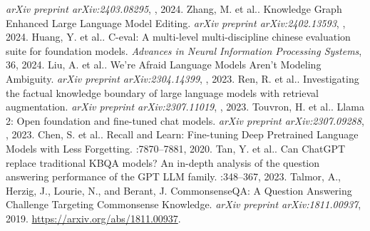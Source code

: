 \begin{thebibliography}{10}
\begin{small}
\newblock \emph{arXiv preprint arXiv:2403.08295}, , 2024.
 Zhang, M. et al.. 
\newblock Knowledge Graph Enhanced Large Language Model Editing. 
\newblock \emph{arXiv preprint arXiv:2402.13593}, , 2024.
 Huang, Y. et al.. 
\newblock C-eval: A multi-level multi-discipline chinese evaluation suite for foundation models. 
\newblock \emph{Advances in Neural Information Processing Systems}, 36, 2024.
 Liu, A. et al.. 
\newblock We're Afraid Language Models Aren't Modeling Ambiguity. 
\newblock \emph{arXiv preprint arXiv:2304.14399}, , 2023.
 Ren, R. et al.. 
\newblock Investigating the factual knowledge boundary of large language models with retrieval augmentation. 
\newblock \emph{arXiv preprint arXiv:2307.11019}, , 2023.
 Touvron, H. et al.. 
\newblock Llama 2: Open foundation and fine-tuned chat models. 
\newblock \emph{arXiv preprint arXiv:2307.09288}, , 2023.
 Chen, S. et al.. 
\newblock Recall and Learn: Fine-tuning Deep Pretrained Language Models with Less Forgetting. 
:7870--7881, 2020.
 Tan, Y. et al.. 
\newblock Can ChatGPT replace traditional KBQA models? An in-depth analysis of the question answering performance of the GPT LLM family. 
:348--367, 2023.
 Talmor, A., Herzig, J., Lourie, N., and Berant, J.
\newblock CommonsenseQA: A Question Answering Challenge Targeting Commonsense Knowledge.
\newblock \emph{arXiv preprint arXiv:1811.00937}, 2019.
\newblock \url{https://arxiv.org/abs/1811.00937}.
\end{small}
\end{thebibliography}
